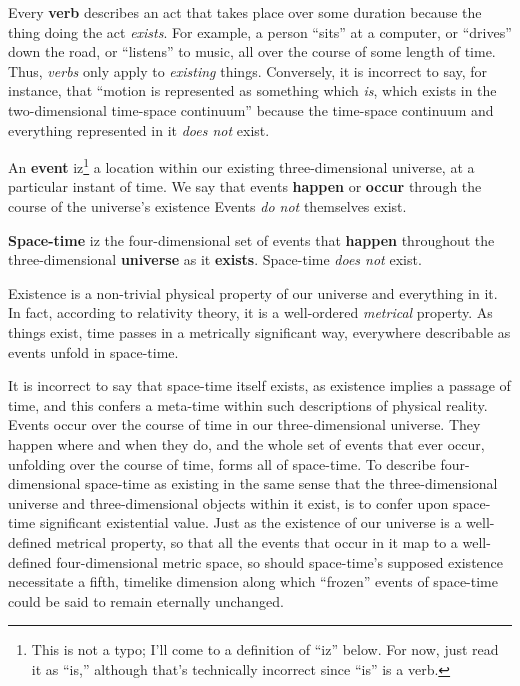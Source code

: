 \documentclass[aps,rmp,groupedaddress,twocolumn,10pt]{revtex4-2}
\begin{document}
Every \textbf{verb} describes an act that takes place over some duration because the thing doing the act \textit{exists}. For example, a person ``sits'' at a computer, or ``drives'' down the road, or ``listens'' to music, all over the course of some length of time. Thus, \textit{verbs} only apply to \textit{existing} things. Conversely, it is incorrect to say, for instance, that \cite{Einstein1938} ``motion is represented as something which \textit{is}, which exists in the two-dimensional time-space continuum'' because the time-space continuum and everything represented in it \textit{does not} exist.

An \textbf{event} iz\footnote{This is not a typo; I'll come to a definition of ``iz'' below. For now, just read it as ``is,'' although that's technically incorrect since ``is'' is a verb.} a location within our existing three-dimensional universe, at a particular instant of time. We say that events \textbf{happen} or \textbf{occur} through the course of the universe's existence Events \textit{do not} themselves exist.

\textbf{Space-time} iz the four-dimensional set of events that \textbf{happen} throughout the three-dimensional \textbf{universe} as it \textbf{exists}. Space-time \textit{does not} exist.

Existence is a non-trivial physical property of our universe and everything in it. In fact, according to relativity theory, it is a well-ordered \textit{metrical} property. As things exist, time passes in a metrically significant way, everywhere describable as events unfold in space-time. 

It is incorrect to say that space-time itself exists, as existence implies a passage of time, and this confers a meta-time within such descriptions of physical reality. Events occur over the course of time in our three-dimensional universe. They happen where and when they do, and the whole set of events that ever occur, unfolding over the course of time, forms all of space-time. To describe four-dimensional space-time as existing in the same sense that the three-dimensional universe and three-dimensional objects within it exist, is to confer upon space-time significant existential value. Just as the existence of our universe is a well-defined metrical property, so that all the events that occur in it map to a well-defined four-dimensional metric space, so should space-time's supposed existence necessitate a fifth, timelike dimension along which ``frozen'' events of space-time could be said to remain eternally unchanged.
\end{document}
